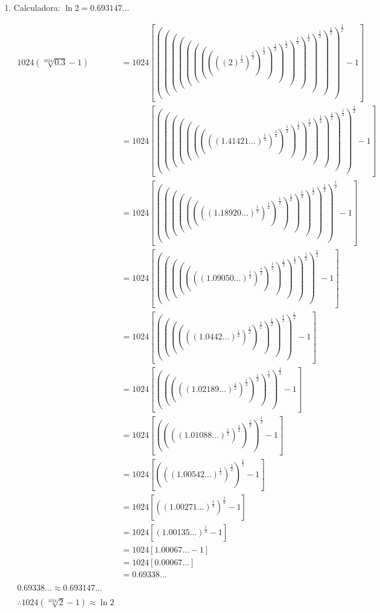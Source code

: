 \documentclass[12pt]{article}
\begin{document}
\begin{enumerate}[label=\alph*)]
\begin{enumerate}
\item Calculadora: $\ln{2} = 0.693147\ldots$
  
  \begin{align*}
    1024(\sqrt[1024]{0.3}-1)
    &= 1024 \left[
      ((((((((((2)^{\frac{1}{2}})^{\frac{1}{2}})^{\frac{1}{2}})^{\frac{1}{2}})^{\frac{1}{2}})^{\frac{1}{2}})^{\frac{1}{2}})^{\frac{1}{2}})^{\frac{1}{2}})^{\frac{1}{2}}
      -1\right]\\
    &= 1024 \left[
      (((((((((1.41421\ldots)^{\frac{1}{2}})^{\frac{1}{2}})^{\frac{1}{2}})^{\frac{1}{2}})^{\frac{1}{2}})^{\frac{1}{2}})^{\frac{1}{2}})^{\frac{1}{2}})^{\frac{1}{2}}
      -1\right]\\
    &= 1024 \left[
      ((((((((1.18920\ldots)^{\frac{1}{2}})^{\frac{1}{2}})^{\frac{1}{2}})^{\frac{1}{2}})^{\frac{1}{2}})^{\frac{1}{2}})^{\frac{1}{2}})^{\frac{1}{2}}
      -1\right]\\
    &= 1024 \left[
      (((((((1.09050\ldots)^{\frac{1}{2}})^{\frac{1}{2}})^{\frac{1}{2}})^{\frac{1}{2}})^{\frac{1}{2}})^{\frac{1}{2}})^{\frac{1}{2}}
      -1\right]\\
    &= 1024 \left[
      ((((((1.0442\ldots)^{\frac{1}{2}})^{\frac{1}{2}})^{\frac{1}{2}})^{\frac{1}{2}})^{\frac{1}{2}})^{\frac{1}{2}}
      -1\right]\\
    &= 1024 \left[
      (((((1.02189\ldots)^{\frac{1}{2}})^{\frac{1}{2}})^{\frac{1}{2}})^{\frac{1}{2}})^{\frac{1}{2}}
      -1\right]\\
    &= 1024 \left[
      ((((1.01088\ldots)^{\frac{1}{2}})^{\frac{1}{2}})^{\frac{1}{2}})^{\frac{1}{2}}
      -1\right]\\
    &= 1024 \left[
      (((1.00542\ldots)^{\frac{1}{2}})^{\frac{1}{2}})^{\frac{1}{2}}
      -1\right]\\
    &= 1024 \left[
      ((1.00271\ldots)^{\frac{1}{2}})^{\frac{1}{2}}
      -1\right]\\
    &= 1024 \left[
      (1.00135\ldots)^{\frac{1}{2}}
      -1\right]\\
    &= 1024 \left[
      1.00067\ldots
      -1\right]\\
    &= 1024 [0.00067\ldots] \\
    &= 0.69338\ldots \\ \\
    0.69338\ldots \approx 0.693147\ldots\\ \\
    \therefore
    1024(\sqrt[1024]{2}-1)\approx \ln{2}
  \end{align*}
\end{enumerate}


\end{enumerate}
\end{document}
